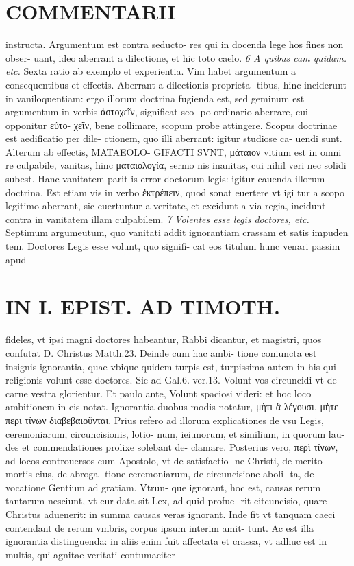 \documentclass{article}
\begin{document}
\begin{pages}
\section*{COMMENTARII }
\marginpar{[ p.24 ]}\pstart instructa. Argumentum est contra seducto- res qui in docenda lege hos fines non obser- uant, ideo aberrant a dilectione, et hic toto caelo.  \pend
\textit{6 A quibus cam quidam. etc. }\pstart Sexta ratio ab exemplo et experientia. Vim habet argumentum a consequentibus et effectis. Aberrant a dilectionis proprieta- tibus, hinc inciderunt in vaniloquentiam: ergo illorum doctrina fugienda est, sed geminum est argumentum in verbis ἀστοχεῖν, significat sco- po ordinario aberrare, cui opponitur εὐτο- χεῖν, bene collimare, scopum probe attingere. Scopus doctrinae est aedificatio per dile- ctionem, quo illi aberrant: igitur studiose ca- uendi sunt. Alterum ab effectis, MATAEOLO- GIFACTI SVNT, μάταιον vitium est in omni re culpabile, vanitas, hinc ματαιολογία, sermo nis inanitas, cui nihil veri nec solidi subest. Hanc vanitatem parit is error doctorum legis: igitur cauenda illorum doctrina. Est etiam vis in verbo ἐκτρέπειν, quod sonat euertere vt igi tur a scopo legitimo aberrant, sic euertuntur a veritate, et excidunt a via regia, incidunt contra in vanitatem illam culpabilem.  \pend
\textit{7 Volentes esse legis doctores, etc. }\pstart Septimum argumeutum, quo vanitati addit ignorantiam crassam et satis impuden tem. Doctores Legis esse volunt, quo signifi- cat eos titulum hunc venari passim apud  \pend
\section*{IN I. EPIST. AD TIMOTH. }
\marginpar{[ p.25 ]}\pstart fideles, vt ipsi magni doctores habeantur, Rabbi dicantur, et magistri, quos confutat D. Christus Matth.23. Deinde cum hac ambi- tione coniuncta est insignis ignorantia, quae vbique quidem turpis est, turpissima autem in his qui religionis volunt esse doctores. Sic ad Gal.6. ver.13. Volunt vos circuncidi vt de carne vestra glorientur. Et paulo ante, Volunt spaciosi videri: et hoc loco ambitionem in eis notat. Ignorantia duobus modis notatur, μὴτι ἂ λέγουσι, μὴτε περι τίνων διαβεβαιοῦνται. Prius refero ad illorum explicationes de vsu Legis, ceremoniarum, circuncisionis, lotio- num, ieiunorum, et similium, in quorum lau- des et commendationes prolixe solebant de- clamare. Posterius vero, περὶ τίνων, ad locos controuersos cum Apostolo, vt de satisfactio- ne Christi, de merito mortis eius, de abroga- tione ceremoniarum, de circuncisione aboli- ta, de vocatione Gentium ad gratiam. Vtrun- que ignorant, hoc est, causas rerum tantarum nesciunt, vt cur data sit Lex, ad quid profue- rit citcuncisio, quare Christus aduenerit: in summa causas veras ignorant.  \pend\pstart Inde fit vt tanquam caeci contendant de rerum vmbris, corpus ipsum interim amit- tunt. Ac est illa ignorantia distinguenda: in aliis enim fuit affectata et crassa, vt adhuc est in multis, qui agnitae veritati contumaciter  \pend

\end{pages}
\end{document}
